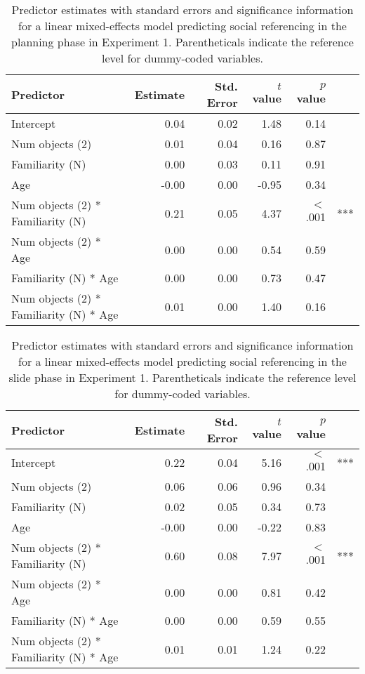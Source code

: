 \documentclass[english,man]{apa6}
\theoremstyle{definition}
\theoremstyle{definition}
\theoremstyle{definition}
\theoremstyle{remark}
\begin{document}
\begin{table}[H]
\centering
\caption{Predictor estimates with standard errors and significance information for a linear mixed-effects model predicting social referencing in the planning phase in Experiment 1. Parentheticals indicate the reference level for dummy-coded variables.} 
\label{tab:exp1_p_reg}
\begin{tabular}{lrrrrl}
 Predictor & Estimate & Std. Error & $t$ value & $p$ value &  \\ 
  \hline
Intercept & 0.04 & 0.02 & 1.48 & 0.14 &  \\ 
  Num objects (2) & 0.01 & 0.04 & 0.16 & 0.87 &  \\ 
  Familiarity (N) & 0.00 & 0.03 & 0.11 & 0.91 &  \\ 
  Age & -0.00 & 0.00 & -0.95 & 0.34 &  \\ 
  Num objects (2) * Familiarity (N) & 0.21 & 0.05 & 4.37 & $<$ .001 & *** \\ 
  Num objects (2) * Age & 0.00 & 0.00 & 0.54 & 0.59 &  \\ 
  Familiarity (N) * Age & 0.00 & 0.00 & 0.73 & 0.47 &  \\ 
  Num objects (2) * Familiarity (N) * Age & 0.01 & 0.00 & 1.40 & 0.16 &  \\ 
   \hline
\end{tabular}
\end{table}

\begin{table}[H]
\centering
\caption{Predictor estimates with standard errors and significance information for a linear mixed-effects model predicting social referencing in the slide phase in Experiment 1. Parentheticals indicate the reference level for dummy-coded variables.} 
\label{tab:exp1_r_reg}
\begin{tabular}{lrrrrl}
 Predictor & Estimate & Std. Error & $t$ value & $p$ value &  \\ 
  \hline
Intercept & 0.22 & 0.04 & 5.16 & $<$ .001 & *** \\ 
  Num objects (2) & 0.06 & 0.06 & 0.96 & 0.34 &  \\ 
  Familiarity (N) & 0.02 & 0.05 & 0.34 & 0.73 &  \\ 
  Age & -0.00 & 0.00 & -0.22 & 0.83 &  \\ 
  Num objects (2) * Familiarity (N) & 0.60 & 0.08 & 7.97 & $<$ .001 & *** \\ 
  Num objects (2) * Age & 0.00 & 0.00 & 0.81 & 0.42 &  \\ 
  Familiarity (N) * Age & 0.00 & 0.00 & 0.59 & 0.55 &  \\ 
  Num objects (2) * Familiarity (N) * Age & 0.01 & 0.01 & 1.24 & 0.22 &  \\ 
   \hline
\end{tabular}
\end{table}
\end{document}
